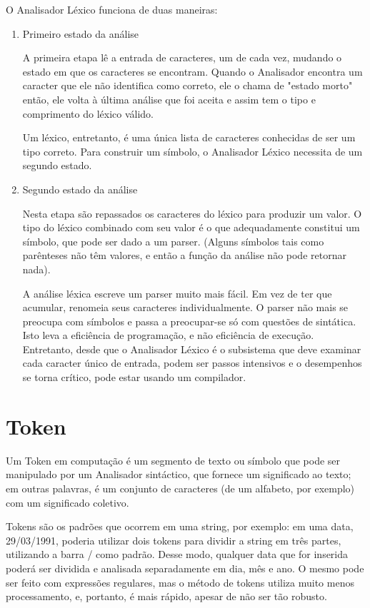 \documentclass[12pt,a4paper,twoside]{report}
\begin{document}
O Analisador Léxico funciona de duas maneiras:
\begin{enumerate}
\item Primeiro estado da análise

A primeira etapa lê a entrada de caracteres, um de cada vez, mudando o estado em que os caracteres se encontram. Quando o Analisador encontra um caracter que ele não identifica como correto, ele o chama de "estado morto" então, ele volta à última análise que foi aceita e assim tem o tipo e comprimento do léxico válido.

Um léxico, entretanto, é uma única lista de caracteres conhecidas de ser um tipo correto. Para construir um símbolo, o Analisador Léxico necessita de um segundo estado.

\item{Segundo estado da análise}

Nesta etapa são repassados os caracteres do léxico para produzir um valor. O tipo do léxico combinado com seu valor é o que adequadamente constitui um símbolo, que pode ser dado a um parser. (Alguns símbolos tais como parênteses não têm valores, e então a função da análise não pode retornar nada).

A análise léxica escreve um parser muito mais fácil. Em vez de ter que acumular, renomeia seus caracteres individualmente. O parser não mais se preocupa com símbolos e passa a preocupar-se só com questões de sintática. Isto leva a eficiência de programação, e não eficiência de execução. Entretanto, desde que o Analisador Léxico é o subsistema que deve examinar cada caracter único de entrada, podem ser passos intensivos e o desempenhos se torna crítico, pode estar usando um compilador.
\end{enumerate}

\section{Token}

Um Token em computação é um segmento de texto ou símbolo que pode ser manipulado por um Analisador sintáctico, que fornece um significado ao texto; em outras palavras, é um conjunto de caracteres (de um alfabeto, por exemplo) com um significado coletivo.

Tokens são os padrões que ocorrem em uma string, por exemplo: em uma data, 29/03/1991, poderia utilizar dois tokens para dividir a string em três partes, utilizando a barra / como padrão. Desse modo, qualquer data que for inserida poderá ser dividida e analisada separadamente em dia, mês e ano. O mesmo pode ser feito com expressões regulares, mas o método de tokens utiliza muito menos processamento, e, portanto, é mais rápido, apesar de não ser tão robusto.
\end{document}
